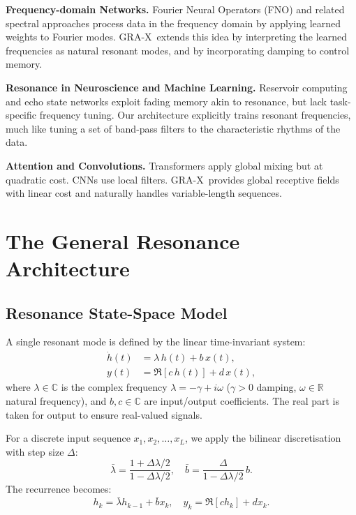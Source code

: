 \documentclass{article}
\newcommand{\R}{\mathbb{R}}
\newcommand{\C}{\mathbb{C}}
\newcommand{\GRA}{\textsc{GRA-X}}
\begin{document}
\textbf{Frequency-domain Networks.}
Fourier Neural Operators (FNO) and related spectral approaches process data in the frequency domain by applying learned weights to Fourier modes.
\GRA\ extends this idea by interpreting the learned frequencies as natural resonant modes, and by incorporating damping to control memory.

\textbf{Resonance in Neuroscience and Machine Learning.}
Reservoir computing and echo state networks exploit fading memory akin to resonance, but lack task-specific frequency tuning.
Our architecture explicitly trains resonant frequencies, much like tuning a set of band-pass filters to the characteristic rhythms of the data.

\textbf{Attention and Convolutions.}
Transformers apply global mixing but at quadratic cost. CNNs use local filters. \GRA\ provides global receptive fields with linear cost and naturally handles variable-length sequences.

\section{The General Resonance Architecture}
\label{sec:method}

\subsection{Resonance State-Space Model}
A single resonant mode is defined by the linear time-invariant system:
\begin{align}
  \dot{h}(t) &= \lambda\, h(t) + b\, x(t), \label{eq:ode} \\
  y(t) &= \Re\left[ c\, h(t) \right] + d\, x(t),
\end{align}
where \(\lambda \in \C\) is the complex frequency \(\lambda = -\gamma + i \omega\) (\(\gamma > 0\) damping, \(\omega \in \R\) natural frequency), and \(b, c \in \C\) are input/output coefficients. The real part is taken for output to ensure real-valued signals.

For a discrete input sequence \(x_1, x_2, \dots, x_L\), we apply the bilinear discretisation with step size \(\Delta\):
\begin{equation}
  \bar{\lambda} = \frac{1+\Delta\lambda/2}{1-\Delta\lambda/2}, \quad
  \bar{b} = \frac{\Delta}{1-\Delta\lambda/2}\, b.
\end{equation}
The recurrence becomes:
\begin{equation}
  h_k = \bar{\lambda} h_{k-1} + \bar{b} x_k, \quad y_k = \Re\left[c h_k\right] + d x_k.
\end{equation}
\end{document}
